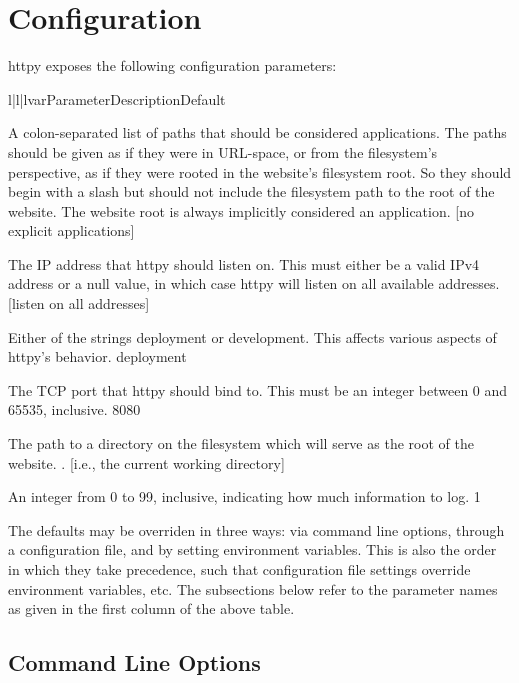 \chapter{Configuration}

httpy exposes the following configuration parameters:


\begin{tableiii}{l|l|l}{var}{Parameter}{Description}{Default}

    {A colon-separated list of paths that should be considered applications. The
    paths should be given as if they were in URL-space, or from the filesystem's
    perspective, as if they were rooted in the website's filesystem root. So
    they should begin with a slash but should not include the filesystem path to
    the root of the website. The website root is always implicitly considered an
    application.}
    {[no explicit applications]}

    {The IP address that httpy should listen on. This must either be a valid
    IPv4 address or a null value, in which case httpy will listen on all
    available addresses.}
    {[listen on all addresses]}

    {Either of the strings deployment or development. This affects various
    aspects of httpy's behavior.}
    {deployment}

    {The TCP port that httpy should bind to. This must be an integer between 0
    and 65535, inclusive.}
    {8080}

    {The path to a directory on the filesystem which will serve as the root of
    the website.}
    {. [i.e., the current working directory]}

    {An integer from 0 to 99, inclusive, indicating how much information to
    log.}
    {1}

\end{tableiii}

The defaults may be overriden in three ways: via command line options, through a
configuration file, and by setting environment variables. This is also the order
in which they take precedence, such that configuration file settings override
environment variables, etc. The subsections below refer to the parameter names
as given in the first column of the above table.




\section{Command Line Options}

